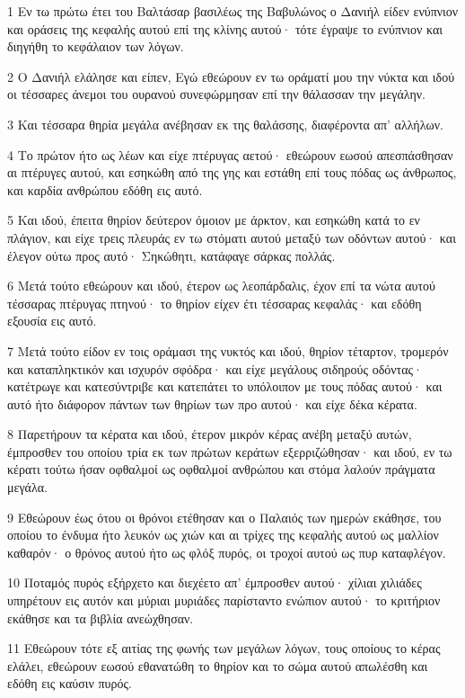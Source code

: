\par 1 Εν τω πρώτω έτει του Βαλτάσαρ βασιλέως της Βαβυλώνος ο Δανιήλ είδεν ενύπνιον και οράσεις της κεφαλής αυτού επί της κλίνης αυτού· τότε έγραψε το ενύπνιον και διηγήθη το κεφάλαιον των λόγων.
\par 2 Ο Δανιήλ ελάλησε και είπεν, Εγώ εθεώρουν εν τω οράματί μου την νύκτα και ιδού οι τέσσαρες άνεμοι του ουρανού συνεφώρμησαν επί την θάλασσαν την μεγάλην.
\par 3 Και τέσσαρα θηρία μεγάλα ανέβησαν εκ της θαλάσσης, διαφέροντα απ' αλλήλων.
\par 4 Το πρώτον ήτο ως λέων και είχε πτέρυγας αετού· εθεώρουν εωσού απεσπάσθησαν αι πτέρυγες αυτού, και εσηκώθη από της γης και εστάθη επί τους πόδας ως άνθρωπος, και καρδία ανθρώπου εδόθη εις αυτό.
\par 5 Και ιδού, έπειτα θηρίον δεύτερον όμοιον με άρκτον, και εσηκώθη κατά το εν πλάγιον, και είχε τρεις πλευράς εν τω στόματι αυτού μεταξύ των οδόντων αυτού· και έλεγον ούτω προς αυτό· Σηκώθητι, κατάφαγε σάρκας πολλάς.
\par 6 Μετά τούτο εθεώρουν και ιδού, έτερον ως λεοπάρδαλις, έχον επί τα νώτα αυτού τέσσαρας πτέρυγας πτηνού· το θηρίον είχεν έτι τέσσαρας κεφαλάς· και εδόθη εξουσία εις αυτό.
\par 7 Μετά τούτο είδον εν τοις οράμασι της νυκτός και ιδού, θηρίον τέταρτον, τρομερόν και καταπληκτικόν και ισχυρόν σφόδρα· και είχε μεγάλους σιδηρούς οδόντας· κατέτρωγε και κατεσύντριβε και κατεπάτει το υπόλοιπον με τους πόδας αυτού· και αυτό ήτο διάφορον πάντων των θηρίων των προ αυτού· και είχε δέκα κέρατα.
\par 8 Παρετήρουν τα κέρατα και ιδού, έτερον μικρόν κέρας ανέβη μεταξύ αυτών, έμπροσθεν του οποίου τρία εκ των πρώτων κεράτων εξερριζώθησαν· και ιδού, εν τω κέρατι τούτω ήσαν οφθαλμοί ως οφθαλμοί ανθρώπου και στόμα λαλούν πράγματα μεγάλα.
\par 9 Εθεώρουν έως ότου οι θρόνοι ετέθησαν και ο Παλαιός των ημερών εκάθησε, του οποίου το ένδυμα ήτο λευκόν ως χιών και αι τρίχες της κεφαλής αυτού ως μαλλίον καθαρόν· ο θρόνος αυτού ήτο ως φλόξ πυρός, οι τροχοί αυτού ως πυρ καταφλέγον.
\par 10 Ποταμός πυρός εξήρχετο και διεχέετο απ' έμπροσθεν αυτού· χίλιαι χιλιάδες υπηρέτουν εις αυτόν και μύριαι μυριάδες παρίσταντο ενώπιον αυτού· το κριτήριον εκάθησε και τα βιβλία ανεώχθησαν.
\par 11 Εθεώρουν τότε εξ αιτίας της φωνής των μεγάλων λόγων, τους οποίους το κέρας ελάλει, εθεώρουν εωσού εθανατώθη το θηρίον και το σώμα αυτού απωλέσθη και εδόθη εις καύσιν πυρός.
